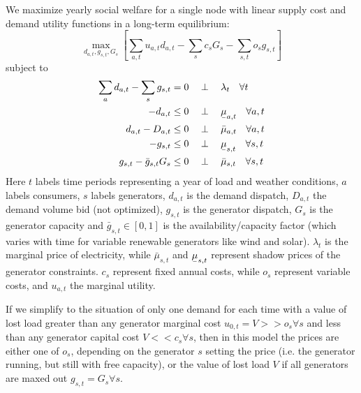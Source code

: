 \documentclass[final,3p,times]{elsarticle}
\newcommand{\ubar}[1]{\text{\b{$#1$}}}
\def\l{\lambda}
\begin{document}
We maximize yearly social welfare for a single node with linear supply cost and demand utility functions in a long-term equilibrium:
\begin{equation}
    \max_{d_{a,t}, g_{s,t}, G_s}\left[\sum_{a,t} u_{a,t} d_{a,t} -  \sum_s c_s G_s - \sum_{s,t} o_{s} g_{s,t}\right]  \label{eq:objl}
\end{equation}
subject to
\begin{align}
   \sum_a d_{a,t} - \sum_s g_{s,t} & =  0 \hspace{0.34cm}\perp \hspace{0.34cm} \l_t \hspace{0.34cm} \forall t \label{eq:balance}\\
    -d_{a,t} & \leq 0 \hspace{0.34cm}\perp \hspace{0.34cm} \ubar{\mu}_{a,t} \hspace{0.34cm} \forall a,t \\
    d_{a,t} - D_{a,t} & \leq 0 \hspace{0.34cm}\perp \hspace{0.34cm} \bar{\mu}_{a,t} \hspace{0.34cm} \forall a,t \\
    -g_{s,t} & \leq 0 \hspace{0.34cm}\perp \hspace{0.34cm} \ubar{\mu}_{s,t} \hspace{0.34cm} \forall s,t \\
         g_{s,t} - \bar{g}_{s,t} G_s & \leq 0 \hspace{0.34cm}\perp \hspace{0.34cm} \bar{\mu}_{s,t} \hspace{0.34cm} \forall s,t
\end{align}
Here $t$ labels time periods representing a year of load and weather conditions, $a$ labels consumers, $s$ labels generators, $d_{a,t}$ is the
demand dispatch, $D_{a,t}$ the demand volume bid (not optimized), $g_{s,t}$ is the generator dispatch, $G_s$ is the generator
capacity and $\bar{g}_{s,t}\in[0,1]$ is the availability/capacity factor (which
varies with time for variable renewable generators like wind and
solar). $\l_t$ is the marginal price of electricity, while
$\bar{\mu}_{s,t}$ and $\ubar{\mu}_{s,t}$ represent shadow prices of
the generator constraints. $c_s$ represent fixed annual costs, while
$o_s$ represent variable costs, and $u_{a,t}$ the marginal utility.

If we simplify to the situation of only one demand for each time with
a value of lost load greater than any generator marginal cost $u_{0,t}
= V >> o_s \forall s$ and less than any generator capital cost $V <<
c_s \forall s$, then in this model the prices are either one of $o_s$,
depending on the generator $s$ setting the price (i.e. the generator
running, but still with free capacity), or the value of lost load $V$
if all generators are maxed out $g_{s,t} = G_s \forall s$.
\end{document}
